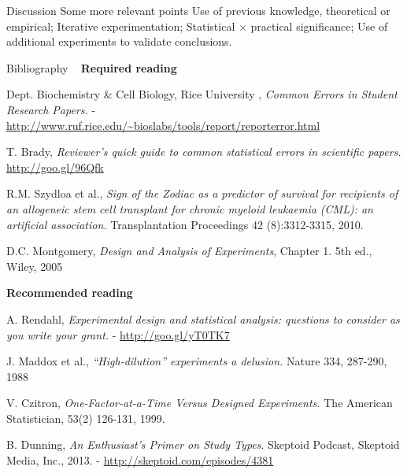 \documentclass[t]{beamer}
\begin{document}
\begin{ftst}
{Discussion}
 {Some more relevant points}
\bitems Use of previous knowledge, theoretical or empirical;
	\spitem Iterative experimentation;
	\spitem Statistical $\times$ practical significance;
	\spitem Use of additional experiments to validate conclusions.
\eitem
\end{ftst}



\begin{ftst}
{Bibliography}
{\ }
\scriptsize
\textbf{Required reading}

\benums Dept. Biochemistry \& Cell Biology, Rice University , \textit{Common Errors in Student Research Papers.} - {\tiny\url{http://www.ruf.rice.edu/~bioslabs/tools/report/reporterror.html}}
\item T. Brady, \textit{Reviewer's quick guide to common statistical errors in scientific papers.}\\
{\tiny\url{http://goo.gl/96Qfk}}
\item R.M. Szydloa et al., \textit{Sign of the Zodiac as a predictor of survival for recipients of an allogeneic stem cell transplant for chronic myeloid leukaemia (CML): an artificial association.} Transplantation Proceedings 42 (8):3312-3315, 2010.
\item D.C. Montgomery, \textit{Design and Analysis of Experiments}, Chapter 1. 5th ed., Wiley, 2005
\eenum

\textbf{Recommended reading}

\benums A. Rendahl, \textit{Experimental design and statistical analysis: questions to consider as you write your grant.} - {\tiny\url{http://goo.gl/yT0TK7}}
\item J. Maddox et al., \textit{``High-dilution'' experiments a delusion.} Nature 334, 287-290, 1988
\item V. Czitron, \textit{One-Factor-at-a-Time Versus Designed Experiments.} The American Statistician, 53(2) 126-131, 1999.
\item B. Dunning, \textit{An Enthusiast's Primer on Study Types}. Skeptoid Podcast, Skeptoid Media, Inc., 2013. - 
{\tiny\url{http://skeptoid.com/episodes/4381}}

\eenum
\end{ftst}

\end{document}
